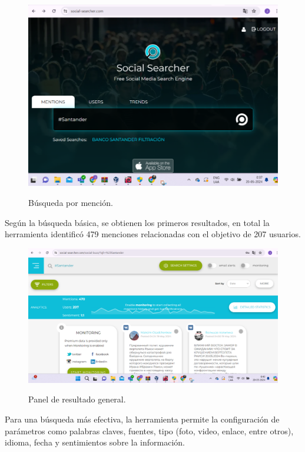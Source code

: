 \documentclass[stu, 11pt, letterpaper, donotrepeattitle, floatsintext, natbib]{apa7}
\begin{document}
\begin{figure}[H]
\centering
\caption{Búsqueda por mención. }
\includegraphics[width=0.75\linewidth]{osi8.png} %
\label{fig:OverallEffect}
\end{figure}

Según la búsqueda básica, se obtienen los primeros resultados, en total la herramienta identificó 479 menciones relacionadas con el objetivo de 207 usuarios.

\begin{figure}[H]
\centering
\caption{Panel de resultado general. }
\includegraphics[width=0.75\linewidth]{osi9.png} %
\label{fig:OverallEffect}
\end{figure}

Para una búsqueda más efectiva, la herramienta permite la configuración de parámetros como palabras claves, fuentes, tipo (foto, video, enlace, entre otros), idioma, fecha y sentimientos sobre la información.
\end{document}
